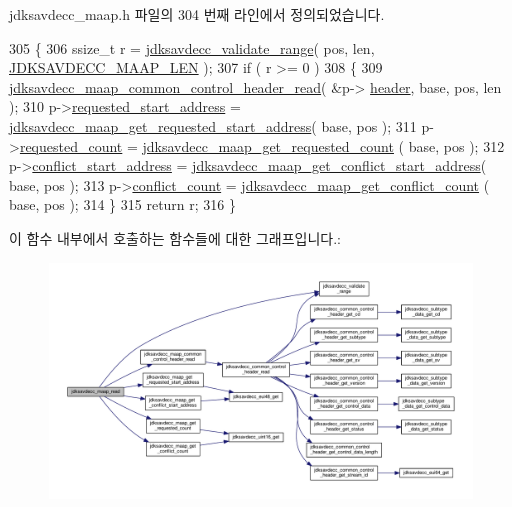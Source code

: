 jdksavdecc\+\_\+maap.\+h 파일의 304 번째 라인에서 정의되었습니다.


\begin{DoxyCode}
305 \{
306     ssize\_t r = \hyperlink{group__util_ga9c02bdfe76c69163647c3196db7a73a1}{jdksavdecc\_validate\_range}( pos, len, 
      \hyperlink{group__maap_ga554b0e25c8ea77e28e7720dd4662758b}{JDKSAVDECC\_MAAP\_LEN} );
307     \textcolor{keywordflow}{if} ( r >= 0 )
308     \{
309         \hyperlink{group__maap_ga8996877577f51c77eea7402da4d29a66}{jdksavdecc\_maap\_common\_control\_header\_read}( &p->
      \hyperlink{structjdksavdecc__maap_a14c416d0f59ebb809de1ab5889e4cd06}{header}, base, pos, len );
310         p->\hyperlink{structjdksavdecc__maap_a89e8561b4567080302ee157bb8d1e6c6}{requested\_start\_address} = 
      \hyperlink{group__maap_gaae4ba6d9f12fa49106ae74c0148dc33d}{jdksavdecc\_maap\_get\_requested\_start\_address}( base, pos );
311         p->\hyperlink{structjdksavdecc__maap_a3b7ca808f59412368434591249aa8a79}{requested\_count} = \hyperlink{group__maap_ga5fe709a6899411d9c88706a26b7afc2e}{jdksavdecc\_maap\_get\_requested\_count}
      ( base, pos );
312         p->\hyperlink{structjdksavdecc__maap_a8e207eea768f9c09349717e706b65a3b}{conflict\_start\_address} = 
      \hyperlink{group__maap_gad3974960a03d497ccfa9f8e966480aa7}{jdksavdecc\_maap\_get\_conflict\_start\_address}( base, pos );
313         p->\hyperlink{structjdksavdecc__maap_a7454bb2b51c745c38822d008f1a322a1}{conflict\_count} = \hyperlink{group__maap_ga5ee187eaa19bfb46348ecb21ed2445a6}{jdksavdecc\_maap\_get\_conflict\_count}
      ( base, pos );
314     \}
315     \textcolor{keywordflow}{return} r;
316 \}
\end{DoxyCode}


이 함수 내부에서 호출하는 함수들에 대한 그래프입니다.\+:
\nopagebreak
\begin{figure}[H]
\begin{center}
\leavevmode
\includegraphics[width=350pt]{group__maap_ga6d3101b71cf397abb634bf28e78f1522_cgraph}
\end{center}
\end{figure}


